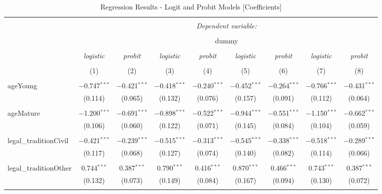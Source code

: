 \documentclass[a4paper,nobind]{templates/ociamthesis}
\begin{document}
\begin{table}[!htbp] \centering 
  \caption{Regression Results - Logit and Probit Models [Coefficients]} 
  \label{} 
\footnotesize 
\begin{tabular}{@{\extracolsep{5pt}}lcccccccc} 
\\[-1.8ex]\hline 
\hline \\[-1.8ex] 
 & \multicolumn{8}{c}{\textit{Dependent variable:}} \\ 
\cline{2-9} 
\\[-1.8ex] & \multicolumn{8}{c}{dummy} \\ 
\\[-1.8ex] & \textit{logistic} & \textit{probit} & \textit{logistic} & \textit{probit} & \textit{logistic} & \textit{probit} & \textit{logistic} & \textit{probit} \\ 
\\[-1.8ex] & (1) & (2) & (3) & (4) & (5) & (6) & (7) & (8)\\ 
\hline \\[-1.8ex] 
 ageYoung & $-$0.747$^{***}$ & $-$0.421$^{***}$ & $-$0.418$^{***}$ & $-$0.240$^{***}$ & $-$0.452$^{***}$ & $-$0.264$^{***}$ & $-$0.766$^{***}$ & $-$0.431$^{***}$ \\ 
  & (0.114) & (0.065) & (0.132) & (0.076) & (0.157) & (0.091) & (0.112) & (0.064) \\ 
  & & & & & & & & \\ 
 ageMature & $-$1.200$^{***}$ & $-$0.691$^{***}$ & $-$0.898$^{***}$ & $-$0.522$^{***}$ & $-$0.944$^{***}$ & $-$0.551$^{***}$ & $-$1.150$^{***}$ & $-$0.662$^{***}$ \\ 
  & (0.106) & (0.060) & (0.122) & (0.071) & (0.145) & (0.084) & (0.104) & (0.059) \\ 
  & & & & & & & & \\ 
 legal\_traditionCivil & $-$0.421$^{***}$ & $-$0.239$^{***}$ & $-$0.515$^{***}$ & $-$0.313$^{***}$ & $-$0.545$^{***}$ & $-$0.338$^{***}$ & $-$0.518$^{***}$ & $-$0.289$^{***}$ \\ 
  & (0.117) & (0.068) & (0.127) & (0.074) & (0.140) & (0.082) & (0.114) & (0.066) \\ 
  & & & & & & & & \\ 
 legal\_traditionOther & 0.744$^{***}$ & 0.387$^{***}$ & 0.790$^{***}$ & 0.416$^{***}$ & 0.870$^{***}$ & 0.466$^{***}$ & 0.743$^{***}$ & 0.387$^{***}$ \\ 
  & (0.132) & (0.073) & (0.149) & (0.084) & (0.167) & (0.094) & (0.130) & (0.072) \\ 
  & & & & & & & & \\ 

\end{tabular}
\end{table}
\end{document}
